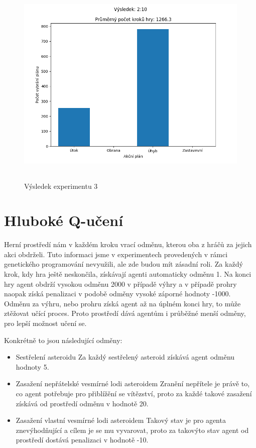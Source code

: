 \begin{figure}[H]\centering
\includegraphics[width=125mm, height=100mm]{./Obrazky/Experiment03Results.png}
\caption{Výsledek experimentu 3}
\label{Výsledek experimentu 03}
\end{figure}




\newpage
\section{Hluboké Q-učení}
Herní prostředí nám v každém kroku vrací odměnu, kterou oba z hráčů za jejich akci obdrželi. Tuto informaci jsme v experimentech provedených v rámci genetického programování nevyužili, ale zde budou mít zásadní roli.
Za každý krok, kdy hra ještě neskončila, získávají agenti automaticky odměnu 1. Na konci hry agent obdrží vysokou odměnu 2000 v případě výhry a v případě prohry naopak získá penalizaci v podobě odměny vysoké záporné hodnoty -1000.
Odměnu za výhru, nebo prohru získá agent až na úplném konci hry, to může ztěžovat učící proces. Proto prostředí dává agentům i průběžné menší odměny, pro lepší možnost učení se.

Konkrétně to jsou následující odměny:
\begin{itemize}
    \item Sestřelení asteroidu
        \newline
        Za každý sestřelený asteroid získává agent odměnu hodnoty 5.
    \item Zasažení nepřátelské vesmírné lodi asteroidem 
        \newline
        Zranění nepřítele je právě to, co agent potřebuje pro přiblížění se vítězství, proto za každé takové zasažení získává od prostředí odměnu v hodnotě 20.
    \item Zasažení vlastní vesmírné lodi asteroidem
        \newline
        Takový stav je pro agenta znevýhodňující a cílem je se mu vyvarovat, proto za takovýto stav agent od prostředí dostává penalizaci v hodnotě -10.
\end{itemize}


